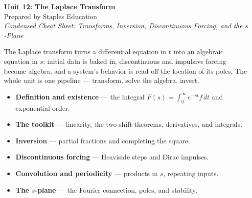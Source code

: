 




\begin{center}
    {\LARGE \bfseries Unit 12: The Laplace Transform}\\[6pt]
    {\large Prepared by Staples Education}\\[4pt]
    {\itshape Condensed Cheat Sheet: Transforms, Inversion, Discontinuous Forcing, and the $s$-Plane}
\end{center}

\vspace{0.4em}

\begin{topicsbox}
The Laplace transform turns a differential equation in $t$ into an algebraic equation
in $s$: initial data is baked in, discontinuous and impulsive forcing become algebra,
and a system's behavior is read off the location of its poles. The whole unit is one
pipeline --- transform, solve the algebra, invert.
\begin{itemize}[leftmargin=1.4em, itemsep=3pt]
    \item \textbf{Definition and existence} --- the integral $F(s)=\int_0^\infty e^{-st}f\,dt$
          and exponential order.
    \item \textbf{The toolkit} --- linearity, the two shift theorems, derivatives,
          and integrals.
    \item \textbf{Inversion} --- partial fractions and completing the square.
    \item \textbf{Discontinuous forcing} --- Heaviside steps and Dirac impulses.
    \item \textbf{Convolution and periodicity} --- products in $s$, repeating inputs.
    \item \textbf{The $s$-plane} --- the Fourier connection, poles, and stability.
\end{itemize}
\end{topicsbox}


